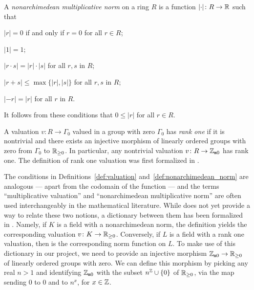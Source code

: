 \documentclass[sigplan,screen]{acmart}
\begin{document}
\begin{definition}\label{def:nonarchimedean_norm}
A \emph{nonarchimedean multiplicative norm} on a ring $R$ is a function $\lvert\cdot\rvert \colon R \to \mathbb{R}$
such that
\begin{listDef}
\item $\lvert r\rvert = 0$ if and only if $r = 0$ for all $r \in R$;
\item $\lvert 1\rvert = 1$;
\item $\lvert r\cdot s\rvert  = \lvert r\rvert \cdot \lvert s\rvert $ for all $r, s$ in $R$;
\item $\lvert r + s\rvert \leq \max \{\lvert r\rvert, \lvert s\rvert \}$ for all $r, s$ in $R$;
\item $\lvert -r\rvert = \lvert r\rvert$ for all $r$ in $R$.
\end{listDef}
It follows from these conditions that $0 \le \lvert r\rvert$ for all $r \in R$.
\end{definition}
A valuation $v \colon R \to \Gamma_0$ valued in a group with zero $\Gamma_0$ has \emph{rank one} if it is nontrivial and there exists an injective morphism of linearly ordered groups with zero from $\Gamma_0$ to $\mathbb{R}_{\ge 0}$. In particular, any nontrivial valuation $v \colon R \to \mathbb{Z}_{\mathtt{m}0}$ has rank one. The definition of rank one valuation was first formalized in \cite{deF23}\href{https://github.com/mariainesdff/norm_extensions_journal_submission/blob/d396130660935464fbc683f9aaf37fff8a890baa/src/rank_one_valuation.lean#L38}{\extlink}.

The conditions in Definitions~\ref{def:valuation} and~\ref{def:nonarchimedean_norm} are analogous --- apart from the codomain of the function --- and the terms ``multiplicative valuation'' and ``nonarchimedean multiplicative norm'' are often used interchangeably in the mathematical literature. While \mathlib does not yet provide a way to relate these two notions, a dictionary between them has been formalized in \cite{deF23}. Namely, if $K$ is a field with a nonarchimedean norm, the definition \href{https://github.com/mariainesdff/norm_extensions_journal_submission/blob/d396130660935464fbc683f9aaf37fff8a890baa/src/normed_valued.lean#L37}{\extlink} yields the corresponding valuation $v \colon K \rightarrow \mathbb{R}_{\ge 0}$. Conversely, if $L$ is a field with a rank one valuation, then \href{https://github.com/mariainesdff/norm_extensions_journal_submission/blob/d396130660935464fbc683f9aaf37fff8a890baa/src/normed_valued.lean#L110}{\extlink} is the corresponding norm function on $L$.
To  make use of this dictionary in our project, we need to provide an injective morphism $\mathbb{Z}_{\mathtt{m}0} \to \mathbb{R}_{\ge 0}$ of linearly ordered groups with zero. We can define this morphism by picking any real $n > 1$ and identifying $\mathbb{Z}_{\mathtt{m}0}$ with the subset $n^{\mathbb{Z}} \cup \{0\}$ of $\mathbb{R}_{\ge 0}$, via the map sending $0$ to $0$ and  to $n^x$, for $x \in \mathbb{Z}$.
\end{document}
